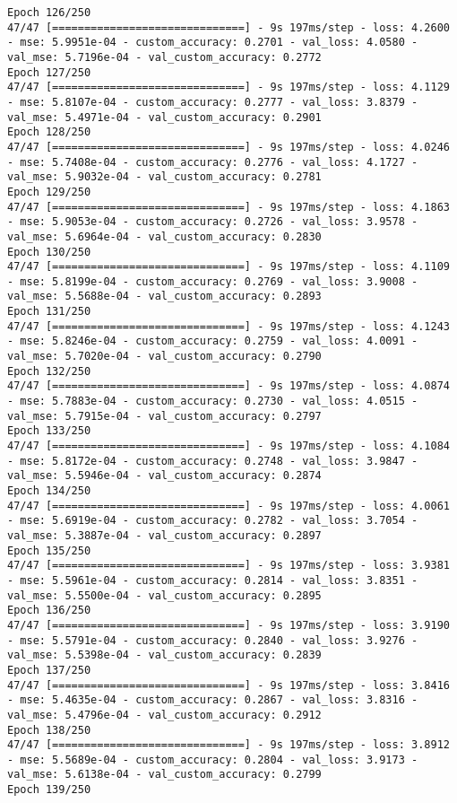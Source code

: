 \begin{lstlisting}
Epoch 126/250
47/47 [==============================] - 9s 197ms/step - loss: 4.2600 - mse: 5.9951e-04 - custom_accuracy: 0.2701 - val_loss: 4.0580 - val_mse: 5.7196e-04 - val_custom_accuracy: 0.2772
Epoch 127/250
47/47 [==============================] - 9s 197ms/step - loss: 4.1129 - mse: 5.8107e-04 - custom_accuracy: 0.2777 - val_loss: 3.8379 - val_mse: 5.4971e-04 - val_custom_accuracy: 0.2901
Epoch 128/250
47/47 [==============================] - 9s 197ms/step - loss: 4.0246 - mse: 5.7408e-04 - custom_accuracy: 0.2776 - val_loss: 4.1727 - val_mse: 5.9032e-04 - val_custom_accuracy: 0.2781
Epoch 129/250
47/47 [==============================] - 9s 197ms/step - loss: 4.1863 - mse: 5.9053e-04 - custom_accuracy: 0.2726 - val_loss: 3.9578 - val_mse: 5.6964e-04 - val_custom_accuracy: 0.2830
Epoch 130/250
47/47 [==============================] - 9s 197ms/step - loss: 4.1109 - mse: 5.8199e-04 - custom_accuracy: 0.2769 - val_loss: 3.9008 - val_mse: 5.5688e-04 - val_custom_accuracy: 0.2893
Epoch 131/250
47/47 [==============================] - 9s 197ms/step - loss: 4.1243 - mse: 5.8246e-04 - custom_accuracy: 0.2759 - val_loss: 4.0091 - val_mse: 5.7020e-04 - val_custom_accuracy: 0.2790
Epoch 132/250
47/47 [==============================] - 9s 197ms/step - loss: 4.0874 - mse: 5.7883e-04 - custom_accuracy: 0.2730 - val_loss: 4.0515 - val_mse: 5.7915e-04 - val_custom_accuracy: 0.2797
Epoch 133/250
47/47 [==============================] - 9s 197ms/step - loss: 4.1084 - mse: 5.8172e-04 - custom_accuracy: 0.2748 - val_loss: 3.9847 - val_mse: 5.5946e-04 - val_custom_accuracy: 0.2874
Epoch 134/250
47/47 [==============================] - 9s 197ms/step - loss: 4.0061 - mse: 5.6919e-04 - custom_accuracy: 0.2782 - val_loss: 3.7054 - val_mse: 5.3887e-04 - val_custom_accuracy: 0.2897
Epoch 135/250
47/47 [==============================] - 9s 197ms/step - loss: 3.9381 - mse: 5.5961e-04 - custom_accuracy: 0.2814 - val_loss: 3.8351 - val_mse: 5.5500e-04 - val_custom_accuracy: 0.2895
Epoch 136/250
47/47 [==============================] - 9s 197ms/step - loss: 3.9190 - mse: 5.5791e-04 - custom_accuracy: 0.2840 - val_loss: 3.9276 - val_mse: 5.5398e-04 - val_custom_accuracy: 0.2839
Epoch 137/250
47/47 [==============================] - 9s 197ms/step - loss: 3.8416 - mse: 5.4635e-04 - custom_accuracy: 0.2867 - val_loss: 3.8316 - val_mse: 5.4796e-04 - val_custom_accuracy: 0.2912
Epoch 138/250
47/47 [==============================] - 9s 197ms/step - loss: 3.8912 - mse: 5.5689e-04 - custom_accuracy: 0.2804 - val_loss: 3.9173 - val_mse: 5.6138e-04 - val_custom_accuracy: 0.2799
Epoch 139/250

\end{lstlisting}
